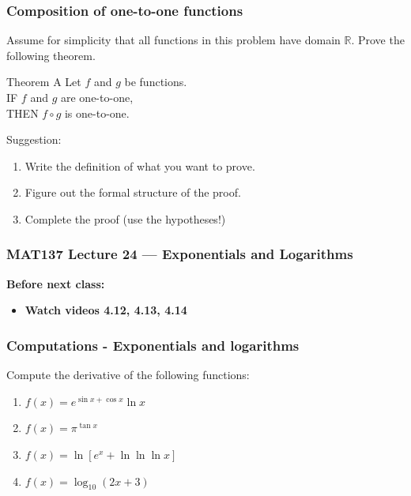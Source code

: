 \documentclass[14pt]{beamer}
\newcommand {\DS} [1] {${\displaystyle #1}$}
\newcommand {\R}{\mathbb{R}}
\newcommand{\p}{\pause}
\begin{document}
\begin{frame}[t]
\frametitle{Composition of one-to-one functions}


Assume for simplicity that all functions in this problem have domain $\R$.  Prove the following theorem.

\vfill


\begin{block}{Theorem A}
Let $f$ and $g$ be functions. \\
IF $f$ and $g$ are one-to-one, \\
THEN $f \circ g$ is one-to-one.
\end{block}

\vfill

\p
Suggestion:
	\begin{enumerate}
		\item Write the definition of what you want to prove.

		\item  Figure out the formal structure of the proof.

		\item   Complete the proof (use the hypotheses!)
	\end{enumerate}

\end{frame}













\begin{frame}
	\frametitle{MAT137 Lecture 24 --- Exponentials and Logarithms}

	\vfill
	{\bf Before next class:}
		\begin{itemize} \normalsize
			\item {\bf Watch videos  4.12, 4.13, 4.14}
		\end{itemize}
\end{frame}


\begin{frame}[t]
\frametitle{Computations - Exponentials and logarithms}



Compute the derivative of the following functions:

\begin{enumerate}
	\item  \DS{f(x) = e^{\sin x + \cos x} \ln x}
\vfill
	\item  \DS{f(x) = \pi^{\tan x}}
\vfill
	\item  \DS{f(x) = \ln \left[ e^x + \ln  \ln  \ln x  \right]}
\vfill
	\item \DS{f(x) = \log_{10} \left( 2x + 3 \right)}
\vfill
\end{enumerate}


\end{frame}
\end{document}
